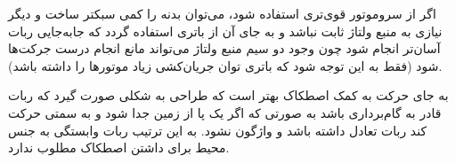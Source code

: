 اگر از سروموتور قوی‌تری استفاده شود، می‌توان بدنه را کمی سبکتر ساخت و دیگر نیازی به منبع ولتاژ ثابت نباشد و به جای آن از باتری استفاده گردد که جابه‌جایی ربات آسان‌تر انجام شود چون وجود دو سیم منبع ولتاژ می‌تواند مانع انجام درست جرکت‌ها شود (فقط به این توجه شود که باتری توان جریان‌کشی زیاد موتورها را داشته باشد).

به جای حرکت به کمک اصطکاک بهتر است که طراحی به شکلی صورت گیرد که ربات قادر به گام‌برداری باشد به صورتی که اگر یک پا از زمین جدا شود و به سمتی حرکت کند ربات تعادل داشته باشد و واژگون نشود. به این ترتیب ربات وابستگی به جنس محیط برای داشتن اصطکاک مطلوب ندارد.